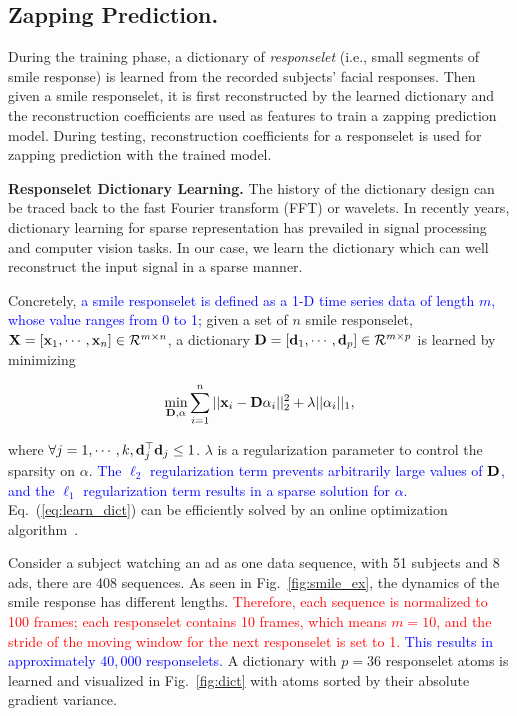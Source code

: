 \documentclass[twoside,leqno,twocolumn]{article}
\newcommand{\Songfan}[1]{\textcolor{red}{#1}}
\newcommand{\SFAdd}[1]{\textcolor{blue}{#1}}
\begin{document}
\subsection{Zapping Prediction.}

During the training phase, a dictionary of \textit{responselet} (i.e., small segments of smile response) is learned from the recorded subjects' facial responses. Then given a smile responselet, it is first reconstructed by the learned dictionary and the reconstruction coefficients are used as features to train a zapping prediction model. During testing, reconstruction coefficients for a responselet is used for zapping prediction with the trained model. 

\noindent \textbf{Responselet Dictionary Learning.} The history of the dictionary design can be traced back to the fast Fourier transform (FFT) or wavelets. In recently years, dictionary learning for sparse representation has prevailed in signal processing and computer vision tasks. In our case, we learn the dictionary which can well reconstruct the input signal in a sparse manner. 

Concretely, \SFAdd{a smile responselet is defined as a 1-D time series data of length $m$, whose value ranges from 0 to 1}; given a set of $n$ smile responselet, ${\bf X}=[{\bf x}_1, \cdots, {\bf x}_n]\in \mathcal{R}^{m\times n}$, a dictionary ${\bf D}=[{\bf d}_1,\cdots,{\bf d}_p] \in \mathcal{R}^{m\times p}$ is learned by minimizing

\begin{align}
\label{eq:learn_dict}
\min_{{\bf D} , \alpha} \sum_{i=1}^n ||{\bf x}_i-{\bf D}\alpha_i||^2_2 +\lambda ||\alpha_i||_1,
\end{align}

\noindent where $\forall j=1,\cdots,k, {\bf d}^\top_j {\bf d}_j \leq 1$. $\lambda$ is a regularization parameter to control the sparsity on $\alpha$. \SFAdd{The $\ell_2$ regularization term prevents arbitrarily large values of ${\bf D}$, and the $\ell_1$ regularization term results in a sparse solution for $\alpha$.} Eq.~(\ref{eq:learn_dict}) can be efficiently solved by an online optimization algorithm~\cite{spams}. 

Consider a subject watching an ad as one data sequence, with 51 subjects and 8 ads, there are 408 sequences. As seen in Fig.~\ref{fig:smile_ex}, the dynamics of the smile response has different lengths. \Songfan{Therefore, each sequence is normalized to 100 frames; each responselet contains 10 frames, which means $m=10$, and the stride of the moving window for the next responselet is set to 1.} \SFAdd{This results in approximately $40,000$ responselets.} A dictionary with $p=36$ responselet atoms is learned and visualized in Fig.~\ref{fig:dict} with atoms sorted by their absolute gradient variance. 
\end{document}
